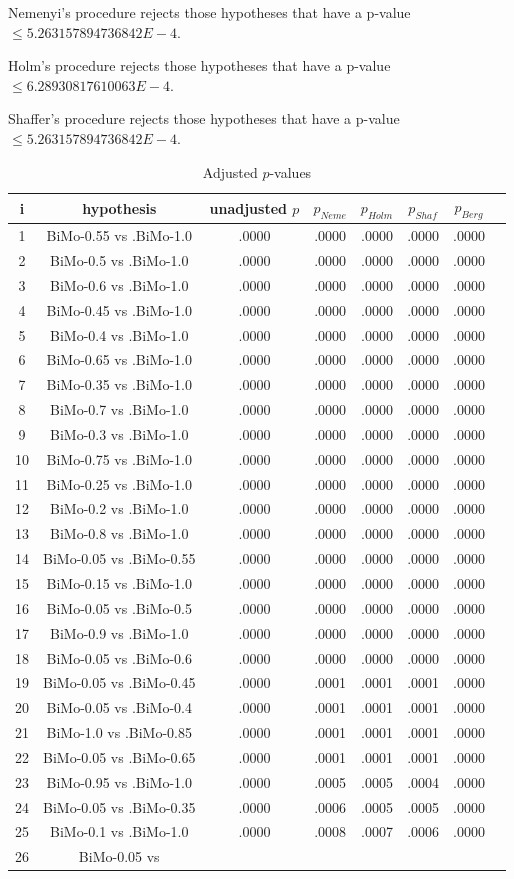 \documentclass[a4paper,10pt]{article}
\begin{document}
\begin{landscape}
\begin{table}[!htp]
\begin{tabular}{cccccc}
\end{tabular}
\end{table}
Nemenyi's procedure rejects those hypotheses that have a p-value $\le5.263157894736842E-4$.


Holm's procedure rejects those hypotheses that have a p-value $\le6.28930817610063E-4$.


Shaffer's procedure rejects those hypotheses that have a p-value $\le5.263157894736842E-4$.


\begin{table}[!htp]
\centering\tiny
\caption{Adjusted $p$-values}
\begin{tabular}{cccccccc}
i&hypothesis&unadjusted $p$&$p_{Neme}$&$p_{Holm}$&$p_{Shaf}$&$p_{Berg}$\\
\hline
1&BiMo-0.55 vs .BiMo-1.0&.0000&.0000&.0000&.0000&.0000\\2&BiMo-0.5 vs .BiMo-1.0&.0000&.0000&.0000&.0000&.0000\\3&BiMo-0.6 vs .BiMo-1.0&.0000&.0000&.0000&.0000&.0000\\4&BiMo-0.45 vs .BiMo-1.0&.0000&.0000&.0000&.0000&.0000\\5&BiMo-0.4 vs .BiMo-1.0&.0000&.0000&.0000&.0000&.0000\\6&BiMo-0.65 vs .BiMo-1.0&.0000&.0000&.0000&.0000&.0000\\7&BiMo-0.35 vs .BiMo-1.0&.0000&.0000&.0000&.0000&.0000\\8&BiMo-0.7 vs .BiMo-1.0&.0000&.0000&.0000&.0000&.0000\\9&BiMo-0.3 vs .BiMo-1.0&.0000&.0000&.0000&.0000&.0000\\10&BiMo-0.75 vs .BiMo-1.0&.0000&.0000&.0000&.0000&.0000\\11&BiMo-0.25 vs .BiMo-1.0&.0000&.0000&.0000&.0000&.0000\\12&BiMo-0.2 vs .BiMo-1.0&.0000&.0000&.0000&.0000&.0000\\13&BiMo-0.8 vs .BiMo-1.0&.0000&.0000&.0000&.0000&.0000\\14&BiMo-0.05 vs .BiMo-0.55&.0000&.0000&.0000&.0000&.0000\\15&BiMo-0.15 vs .BiMo-1.0&.0000&.0000&.0000&.0000&.0000\\16&BiMo-0.05 vs .BiMo-0.5&.0000&.0000&.0000&.0000&.0000\\17&BiMo-0.9 vs .BiMo-1.0&.0000&.0000&.0000&.0000&.0000\\18&BiMo-0.05 vs .BiMo-0.6&.0000&.0000&.0000&.0000&.0000\\19&BiMo-0.05 vs .BiMo-0.45&.0000&.0001&.0001&.0001&.0000\\20&BiMo-0.05 vs .BiMo-0.4&.0000&.0001&.0001&.0001&.0000\\21&BiMo-1.0 vs .BiMo-0.85&.0000&.0001&.0001&.0001&.0000\\22&BiMo-0.05 vs .BiMo-0.65&.0000&.0001&.0001&.0001&.0000\\23&BiMo-0.95 vs .BiMo-1.0&.0000&.0005&.0005&.0004&.0000\\24&BiMo-0.05 vs .BiMo-0.35&.0000&.0006&.0005&.0005&.0000\\25&BiMo-0.1 vs .BiMo-1.0&.0000&.0008&.0007&.0006&.0000\\26&BiMo-0.05 vs 
\end{tabular}
\end{table}
\end{landscape}
\end{document}
